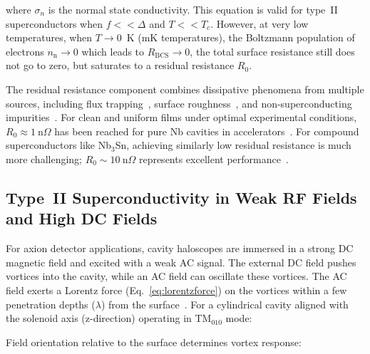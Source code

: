     \noindent where $\sigma_n$ is the normal state conductivity. This equation is valid for type~II superconductors when $f << \Delta$ and $T<<T_c$. However, at very low temperatures, when $T \rightarrow 0$~K (mK temperatures), the Boltzmann population of electrons $n_\text{n} \rightarrow 0$ which leads to $R_{\text{BCS}}\rightarrow 0$, the total surface resistance still does not go to zero, but saturates to a residual resistance $R_0$. 
    
    The residual resistance component combines dissipative phenomena from multiple sources, including flux trapping~\cite{ciovatiHighFieldSlope2010}, surface roughness~\cite{padamseeRFSuperconductivity2009}, and non-superconducting impurities~\cite{alexgurevich33ThermalRF2006}. For clean and uniform films under optimal experimental conditions, $R_0 \approx 1~\text{n}\Omega$ has been reached for pure Nb cavities in accelerators~\cite{romanenkoUltrahighQualityFactors2014}. For compound superconductors like Nb$_3$Sn, achieving similarly low residual resistance is much more challenging; $R_0 \sim 10~\text{n}\Omega$ represents excellent performance~\cite{Posen:2020kei}.
    
    \subsection{Type~II Superconductivity in Weak RF Fields and High DC Fields}\label{sec:campbell}
    
    For axion detector applications, cavity haloscopes are immersed in a strong DC magnetic field and excited with a weak AC signal. The external DC field pushes vortices into the cavity, while an AC field can oscillate these vortices. The AC field exerts a Lorentz force (Eq.~\ref{eq:lorentzforce}) on the vortices within a few penetration depths ($\lambda$) from the surface~\cite{campbellResponsePinnedFlux1969, brandtFluxlineLatticeSuperconductors1995}. For a cylindrical cavity aligned with the solenoid axis (z-direction) operating in TM$_{010}$ mode:
    
    \noindent Field orientation relative to the surface determines vortex response:
    
